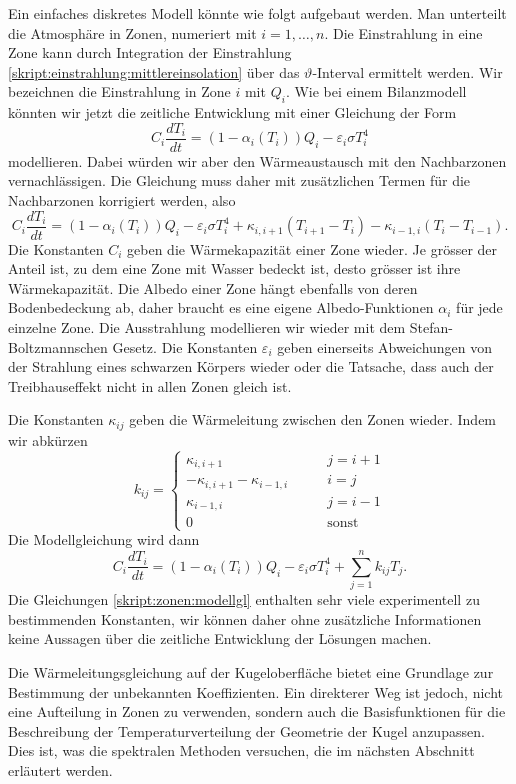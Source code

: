 Ein einfaches diskretes Modell könnte wie folgt aufgebaut werden.
Man unterteilt die Atmosphäre in Zonen, numeriert mit $i=1,\dots,n$.
Die Einstrahlung in eine Zone kann durch Integration der Einstrahlung
\eqref{skript:einstrahlung:mittlereinsolation}
über das $\vartheta$-Interval ermittelt werden.
Wir bezeichnen die Einstrahlung in Zone $i$ mit $Q_i$.
Wie bei einem Bilanzmodell könnten wir jetzt die zeitliche
Entwicklung mit einer Gleichung der Form
\[
C_i\frac{dT_i}{dt}
=
(1-\alpha_i(T_i)) Q_i - \varepsilon_i \sigma T_i^4
\]
modellieren.
Dabei würden wir aber den Wärmeaustausch mit den Nachbarzonen
vernachlässigen.
Die Gleichung muss daher mit zusätzlichen Termen für die Nachbarzonen
korrigiert werden, also
\begin{equation}
C_i\frac{dT_i}{dt}
=
(1-\alpha_i(T_i)) Q_i - \varepsilon_i \sigma T_i^4
+
\kappa_{i,i+1} (T_{i+1}-T_i)
-
\kappa_{i-1,i} (T_i-T_{i-1}).
\end{equation}
Die Konstanten $C_i$ geben die Wärmekapazität einer Zone wieder.
Je grösser der Anteil ist, zu dem eine Zone mit Wasser bedeckt ist,
desto grösser ist ihre Wärmekapazität.
Die Albedo einer Zone hängt ebenfalls von deren Bodenbedeckung ab, 
daher braucht es eine eigene Albedo-Funktionen $\alpha_i$ für jede
einzelne Zone.
Die Ausstrahlung modellieren wir wieder mit dem Stefan-Boltzmannschen
Gesetz.
Die Konstanten $\varepsilon_i$ geben einerseits Abweichungen von
der Strahlung eines schwarzen Körpers wieder oder die Tatsache, dass
auch der Treibhauseffekt nicht in allen Zonen gleich ist.

Die Konstanten $\kappa_{ij}$ geben die Wärmeleitung zwischen den
Zonen wieder.
Indem wir abkürzen
\[
k_{ij}
=
\begin{cases}
\kappa_{i,i+1}&\qquad j=i+1
\\
-\kappa_{i,i+1}-\kappa_{i-1,i}&\qquad i=j
\\
\kappa_{i-1,i}&\qquad j=i-1
\\
0&\qquad\text{sonst}
\end{cases}
\]
Die Modellgleichung wird dann
\begin{equation}
C_i \frac{dT_i}{dt}
=
(1-\alpha_i(T_i)) Q_i - \varepsilon_i \sigma T_i^4
+
\sum_{j=1}^n k_{ij}T_j.
\label{skript:zonen:modellgl}
\end{equation}
Die Gleichungen
\eqref{skript:zonen:modellgl}
enthalten sehr viele experimentell zu bestimmenden Konstanten,
wir können daher ohne zusätzliche Informationen keine Aussagen
über die zeitliche Entwicklung der Lösungen machen.

Die Wärmeleitungsgleichung auf der Kugeloberfläche bietet eine
Grundlage zur Bestimmung der unbekannten Koeffizienten.
Ein direkterer Weg ist jedoch, nicht eine Aufteilung in Zonen
zu verwenden, sondern auch die Basisfunktionen für die Beschreibung
der Temperaturverteilung der Geometrie der Kugel anzupassen.
Dies ist, was die spektralen Methoden versuchen, die im nächsten
Abschnitt erläutert werden.

